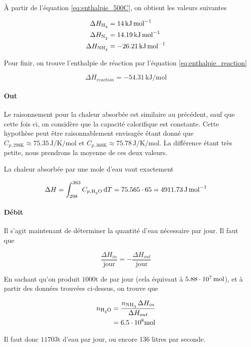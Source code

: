 À partir de l'équation \ref{eq:enthalpie_500C}, 
on obtient les valeurs suivantes

\begin{align*}
	\Delta H_{\ce{H2}} &= 14 \, \si{\kilo\joule\per\mole} \\
	\Delta H_{\ce{N2}} &= 14.19 \, \si{\kilo\joule\per\mole} \\
	\Delta H_{\ce{NH3}} &= -26.21 \, \si{\kilo\joule\per\mole} 
\end{align*}

Pour finir, on trouve l'enthalpie de réaction par l'équation \ref{eq:enthalpie_reaction}

\[
	\Delta H_{reaction} = -54.31 \, \si{\kilo\joule\per\mole}
\]

\paragraph{Out}

Le raisonnement pour la chaleur absorbée est similaire 
au précédent, sauf que cette fois ci, 
on considère que la capacité calorifique est constante.
Cette hypothèse peut être raisonnablement envisagée 
étant donné que \cite{janaf}
$C_{p, 298 \si{\kelvin}} \approx 75.35 \, \si{\joule\per\kelvin\per\mole}$ 
et $C_{p, 368 \si{\kelvin}} \approx 75.78 \, \si{\joule\per\kelvin\per\mole}$.
La différence étant très petite, 
nous prendrons la moyenne de ces deux valeurs. 

La chaleur absorbée par une mole d'eau vaut exactement

\begin{equation}
	\Delta H = \int_{298}^{363} C_{p, \ce{H2O}} \, \dif{T}
	= 75.565 \cdot 65 = 4911.73 \, \si{\joule\per\mole}
\end{equation}

\paragraph{Débit}

Il s'agit maintenant de déterminer la quantité d'eau nécessaire par jour.
Il faut que

\[
	\frac{\Delta H_{in}}{\mathrm{jour}} 
	= - \frac{\Delta H_{out}}{\mathrm{jour}}
\]

En sachant qu'on produit $1000 \si{\tonne}$ de  par jour
(cela équivaut à $5.88\cdot 10^{7} \, \si{\mole}$),
et à partir des données trouvées ci-dessus, 
on trouve que

\begin{align*}
	n_{\ce{H2O}} &= \frac{n_{\ce{NH3}} \, \Delta H_{in}}{\Delta H_{out}} \\
	&= 6.5\e{8} \si{\mole} 
\end{align*}

Il faut donc $11703 \si{\tonne}$ d'eau par jour, 
ou encore 136 litres par seconde.
